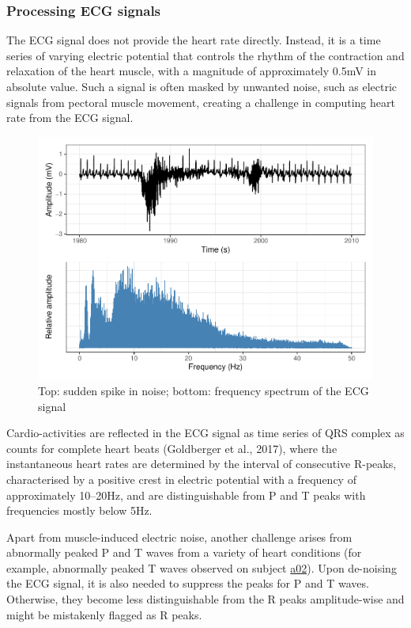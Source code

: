 \documentclass[
]{article}
\begin{document}
\hypertarget{processing-ecg-signals}{%
\subsubsection{Processing ECG signals}\label{processing-ecg-signals}}

The ECG signal does not provide the heart rate directly. Instead, it is
a time series of varying electric potential that controls the rhythm of
the contraction and relaxation of the heart muscle, with a magnitude of
approximately 0.5mV in absolute value. Such a signal is often masked by
unwanted noise, such as electric signals from pectoral muscle movement,
creating a challenge in computing heart rate from the ECG signal.

\begin{figure}

{\centering \includegraphics{report_files/figure-latex/ecg-noise-1} 

}

\caption{Top: sudden spike in noise; bottom: frequency spectrum of the ECG signal}\label{fig:ecg-noise}
\end{figure}

Cardio-activities are reflected in the ECG signal as time series of QRS
complex as counts for complete heart beats (Goldberger et al., 2017),
where the instantaneous heart rates are determined by the interval of
consecutive R-peaks, characterised by a positive crest in electric
potential with a frequency of approximately 10--20Hz, and are
distinguishable from P and T peaks with frequencies mostly below 5Hz.

Apart from muscle-induced electric noise, another challenge arises from
abnormally peaked P and T waves from a variety of heart conditions (for
example, abnormally peaked T waves observed on subject
\protect\hyperlink{visual}{a02}). Upon de-noising the ECG signal, it is
also needed to suppress the peaks for P and T waves. Otherwise, they
become less distinguishable from the R peaks amplitude-wise and might be
mistakenly flagged as R peaks.
\end{document}
